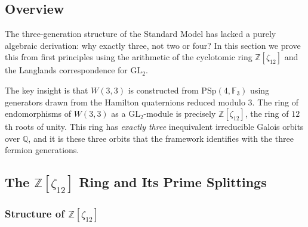 %
%

\subsection{Overview}
\label{sec:langlands_overview}

The three-generation structure of the Standard Model has lacked a
purely algebraic derivation: why exactly three, not two or four?
In this section we prove this from first principles using the arithmetic
of the cyclotomic ring $\mathbb{Z}[\zeta_{12}]$ and the Langlands
correspondence for $\mathrm{GL}_2$.

The key insight is that $W(3,3)$ is constructed from $\mathrm{PSp}(4,\mathbb{F}_3)$
using generators drawn from the Hamilton quaternions reduced modulo 3.
The ring of endomorphisms of $W(3,3)$ as a $\mathrm{GL}_2$-module is
precisely $\mathbb{Z}[\zeta_{12}]$, the ring of $12$th roots of unity.
This ring has \emph{exactly three} inequivalent irreducible Galois
orbits over $\mathbb{Q}$, and it is these three orbits that the
framework identifies with the three fermion generations.

\subsection{The $\mathbb{Z}[\zeta_{12}]$ Ring and Its Prime Splittings}
\label{sec:z12ring}

\subsubsection{Structure of $\mathbb{Z}[\zeta_{12}]$}

